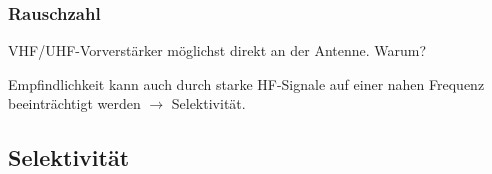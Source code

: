 \begin{frame}
    \frametitle{Rauschzahl}

    VHF/UHF-Vorverstärker möglichst direkt an der Antenne. Warum?\\

    \bigskip

    Empfindlichkeit kann auch durch starke HF-Signale auf einer nahen Frequenz
    beeinträchtigt werden $\rightarrow$ Selektivität.

\end{frame}

\subsection{Selektivität}

